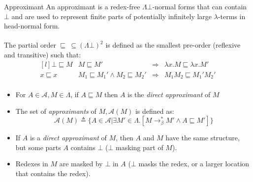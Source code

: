 \begin{definitionbox}{Approximant}
	An approximant is a redex-free $\Lambda\bot$-normal forms that can contain $\bot$ and are used to represent finite parts of potentially infinitely large $\lambda$-terms in head-normal form.
	\\
	\\ The partial order $\sqsubseteq \ \subseteq (\Lambda\bot)^2$ is defined as the smallest pre-order (reflexive and transitive) such that:
	\[\begin{matrix*}[l]
			\bot \sqsubseteq M & M \sqsubseteq M' & \Rightarrow & \lambda x. M \sqsubseteq \lambda x. M' \\
			x \sqsubseteq x & M_1 \sqsubseteq M_1' \land M_2 \sqsubseteq M_2' & \Rightarrow & M_1 M_2 \sqsubseteq M_1' M_2' \\
		\end{matrix*}\]
	\begin{itemize}
		\item For $A \in \mathcal{A}, M \in \Lambda$, if $A \sqsubseteq M$ then $A$ is the \textit{direct approximant} of $M$
		\item {The set of \textit{approximants} of $M, \mathcal{A}(M)$ is defined as:
		      \[\mathcal{A}(M) \triangleq \{A \in \mathcal{A} | \exists M' \in \Lambda . [M \to^*_\beta M' \land A \sqsubseteq M']\}\]
		      }
		\item If $A$ is a \textit{direct approximant} of $M$, then $A$ and $M$ have the same structure, but some parts $A$ contains $\bot$ ($\bot$ masking part of $M$).
		\item Redexes in $M$ are masked by $\bot$ in $A$ ($\bot$ masks the redex, or a larger location that contains the redex).
	\end{itemize}
\end{definitionbox}

